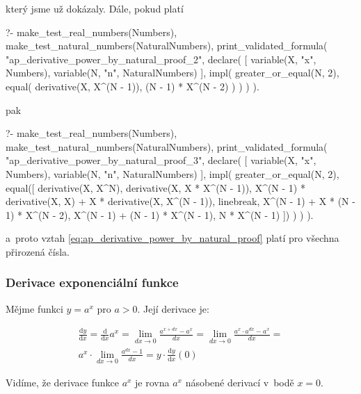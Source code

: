 který jsme už dokázaly. Dále, pokud platí 

\begin{prolog}
?-	make_test_real_numbers(Numbers),
	make_test_natural_numbers(NaturalNumbers),
	print_validated_formula(
		"ap_derivative_power_by_natural_proof_2",
		declare(
			[
				variable(X, "x", Numbers),
				variable(N, "n", NaturalNumbers)
			],
			impl(
				greater_or_equal(N, 2),
				equal(
					derivative(X, X^(N - 1)),
					(N - 1) * X^(N - 2)
				)
			)
		)
	).
\end{prolog}

pak

\begin{prolog}
?-	make_test_real_numbers(Numbers),
	make_test_natural_numbers(NaturalNumbers),
	print_validated_formula(
		"ap_derivative_power_by_natural_proof_3",
		declare(
			[
				variable(X, "x", Numbers),
				variable(N, "n", NaturalNumbers)
			],
			impl(
				greater_or_equal(N, 2),
				equal([
					derivative(X, X^N),
					derivative(X, X * X^(N - 1)),
					X^(N - 1) * derivative(X, X) + X * derivative(X, X^(N - 1)),
					linebreak,				
					X^(N - 1) + X * (N - 1) * X^(N - 2),
					X^(N - 1) + (N - 1) * X^(N - 1),
					N * X^(N - 1)
				])
			)
		)
	).
\end{prolog}

a~proto vztah \eqref{eq:ap_derivative_power_by_natural_proof} platí pro všechna přirozená čísla.

\subsubsection{Derivace exponenciální funkce}

Mějme funkci \(y = a^x\) pro \(a > 0\). Její derivace je:

\begin{equation}
\begin{split}
\frac{\mathrm{d}y}{\mathrm{d}x} = \frac{\mathrm{d}}{\mathrm{d}x} a^x = \lim_{dx \to 0} \frac{a^{x+dx} - a^x}{dx} = \lim_{dx \to 0} \frac{a^x \cdot a^{dx} - a^x}{dx} = \\
a^x \cdot \lim_{dx \to 0} \frac{a^{dx} - 1}{dx} = y \cdot \frac{\mathrm{d}y}{\mathrm{d}x}(0)
\end{split}
\end{equation}

Vidíme, že derivace funkce \(a^x\) je rovna \(a^x\) násobené derivací v~bodě \(x = 0\).

